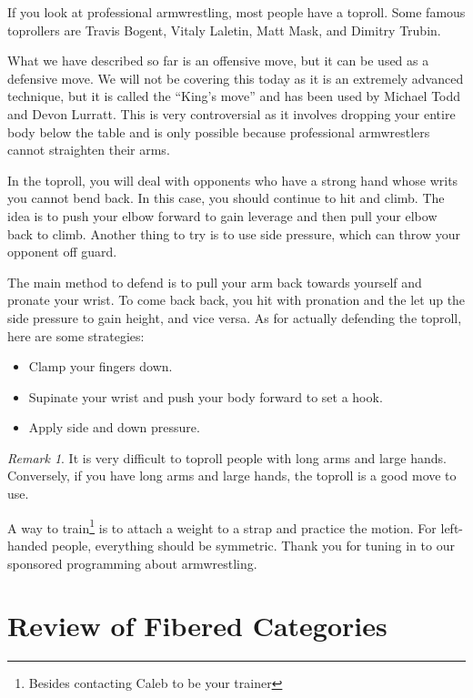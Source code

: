 \documentclass[leqno, openany]{memoir}
\theoremstyle{definition}
\theoremstyle{remark}
\newtheorem{rmk}[thm]{Remark}
\theoremstyle{plain}
\theoremstyle{definition}
\theoremstyle{remark}
\begin{document}
If you look at professional armwrestling, most people have a toproll. Some famous toprollers are Travis Bogent, Vitaly Laletin, Matt Mask, and Dimitry Trubin.

What we have described so far is an offensive move, but it can be used as a defensive move. We will not be covering this today as it is an extremely advanced technique, but it is called the ``King's move'' and has been used by Michael Todd and Devon Lurratt. This is very controversial as it involves dropping your entire body below the table and is only possible because professional armwrestlers cannot straighten their arms.

In the toproll, you will deal with opponents who have a strong hand whose writs you cannot bend back. In this case, you should continue to hit and climb. The idea is to push your elbow forward to gain leverage and then pull your elbow back to climb. Another thing to try is to use side pressure, which can throw your opponent off guard.

The main method to defend is to pull your arm back towards yourself and pronate your wrist. To come back back, you hit with pronation and the let up the side pressure to gain height, and vice versa. As for actually defending the toproll, here are some strategies:
\begin{itemize}
    \item Clamp your fingers down. 
    \item Supinate your wrist and push your body forward to set a hook.
    \item Apply side and down pressure.
\end{itemize}

\begin{rmk}
    It is very difficult to toproll people with long arms and large hands. Conversely, if you have long arms and large hands, the toproll is a good move to use.
\end{rmk}

A way to train\footnote{Besides contacting Caleb to be your trainer} is to attach a weight to a strap and practice the motion. For left-handed people, everything should be symmetric. Thank you for tuning in to our sponsored programming about armwrestling.

\section{Review of Fibered Categories}%
\label{sec:more_on_fibered_categories}
\end{document}
